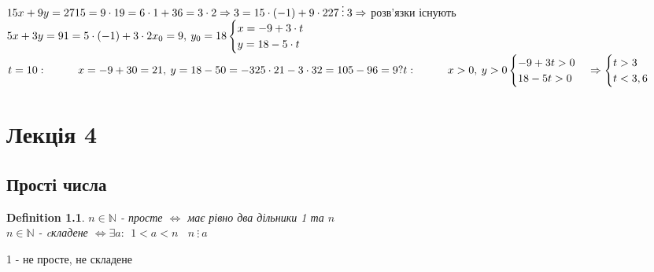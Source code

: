 \documentclass[a4paper,12pt]{bookest}
\newtheorem{definition}{Definition}[section]
\newcommand\tab[1][1cm]{\hspace*{#1}}
\begin{document}
\begin{example}
$15x+9y=27\\ 15=9\cdot 1\\9=6\cdot 1+3\\6=3\cdot 2\Rightarrow3=15\cdot(-1)+9\cdot 2\\27\>\vdots\>3\Rightarrow$ розв'язки існують \\
$5x+3y=9\\1=5\cdot(-1)+3\cdot2\\x_0=9,\>y_0=18\\\begin{cases}
	x=-9+3\cdot t\\y=18-5\cdot t
\end{cases}$\\$t=10:\tab x=-9+30=21,\>y=18-50=-32\\5\cdot21-3\cdot32=105-96=9\\?t:\tab x>0,\>y>0\\\begin{cases}
	-9+3t>0\\18-5t>0
	\end{cases}\Rightarrow\begin{cases}
		t>3\\t<3,6
	\end{cases}$
\end{example}
\chapter{Лекція 4}
\section{Прості числа}
\begin{definition}
	
$n\in\mathbb{N}$ - просте $\Leftrightarrow$ має рівно два дільники 1 та $n$\\
$n\in\mathbb{N}$ - cкладене $\Leftrightarrow\exists a:\>\>1<a<n\>\>\>\>n\>\vdots\>a$\\
\end{definition}
1 - не просте, не складене
\end{document}
